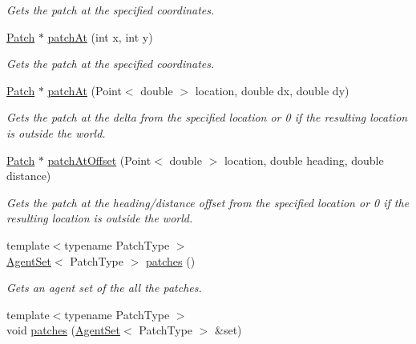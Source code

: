 \begin{DoxyCompactItemize}
\begin{DoxyCompactList}\small\item\em Gets the patch at the specified coordinates. \end{DoxyCompactList}\item 
\hyperlink{classrepast_1_1relogo_1_1_patch}{Patch} $\ast$ \hyperlink{classrepast_1_1relogo_1_1_observer_ad573c6f1bd2d8c8047d025652a43100c}{patch\-At} (int x, int y)
\begin{DoxyCompactList}\small\item\em Gets the patch at the specified coordinates. \end{DoxyCompactList}\item 
\hyperlink{classrepast_1_1relogo_1_1_patch}{Patch} $\ast$ \hyperlink{classrepast_1_1relogo_1_1_observer_a94254d970a0e8f8409b1fa0aca0aab5b}{patch\-At} (Point$<$ double $>$ location, double dx, double dy)
\begin{DoxyCompactList}\small\item\em Gets the patch at the delta from the specified location or 0 if the resulting location is outside the world. \end{DoxyCompactList}\item 
\hyperlink{classrepast_1_1relogo_1_1_patch}{Patch} $\ast$ \hyperlink{classrepast_1_1relogo_1_1_observer_acb1163537fb7f53ccb6cf99d1cfdff47}{patch\-At\-Offset} (Point$<$ double $>$ location, double heading, double distance)
\begin{DoxyCompactList}\small\item\em Gets the patch at the heading/distance offset from the specified location or 0 if the resulting location is outside the world. \end{DoxyCompactList}\item 
{\footnotesize template$<$typename Patch\-Type $>$ }\\\hyperlink{classrepast_1_1relogo_1_1_agent_set}{Agent\-Set}$<$ Patch\-Type $>$ \hyperlink{classrepast_1_1relogo_1_1_observer_ad68866a2584551d27c9bb6c53aca5f20}{patches} ()
\begin{DoxyCompactList}\small\item\em Gets an agent set of the all the patches. \end{DoxyCompactList}\item 
{\footnotesize template$<$typename Patch\-Type $>$ }\\void \hyperlink{classrepast_1_1relogo_1_1_observer_a2384690c4e773727acdccaa7fc314bcd}{patches} (\hyperlink{classrepast_1_1relogo_1_1_agent_set}{Agent\-Set}$<$ Patch\-Type $>$ \&set)

\end{DoxyCompactItemize}

